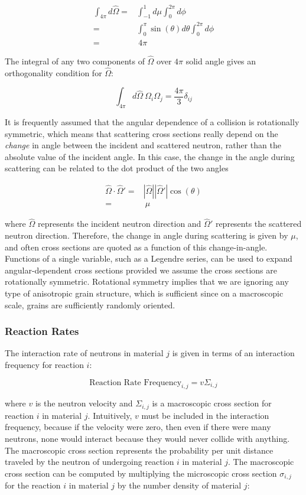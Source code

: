 \documentclass[10pt]{article}
\newcommand{\beq}{\begin{equation}}
\newcommand{\eeq}{\end{equation}}
\newcommand{\beqa}{\begin{equation}\begin{aligned}}
\newcommand{\eeqa}{\end{aligned}\end{equation}}
\newcommand{\hO}{\hat{\Omega}}
\newcommand{\Om}{\Omega}
\begin{document}
\begin{flushleft}
\beqa
\label{eq:4PiOmegaIntegral}
\int_{4\pi}^{ } d\hO   = &\int_{-1}^{1} d\mu \int_{0}^{2\pi} d\phi \\
=& \int_{0}^{\pi} \sin{(\theta)}d\theta \int_{0}^{2\pi} d\phi \\
= &\ 4\pi
\eeqa

The integral of any two components of \(\hO\) over \(4\pi\) solid angle gives an orthogonality condition for \(\hO\):

\beq
\label{eq:4PiOmegaOmega}
\int_{4\pi}^{ } d\hO\ \Om_i\Om_j = \frac{4\pi}{3}\delta_{ij}
\eeq

It is frequently assumed that the angular dependence of a collision is rotationally symmetric, which means that scattering cross sections really depend on the \textit{change} in angle between the incident and scattered neutron, rather than the absolute value of the incident angle. In this case, the change in the angle during scattering can be related to the dot product of the two angles

\beqa
\label{eq:OmegaDotOmega}
\hO  \cdot\hO  ' =& |\hO  ||\hO  '| \cos{(\theta)} \\
=&\ \mu
\eeqa

where \(\hO\) represents the incident neutron direction and \(\hO'\) represents the scattered neutron direction. Therefore, the change in angle during scattering is given by \(\mu\), and often cross sections are quoted as a function of this change-in-angle. Functions of a single variable, such as a Legendre series, can be used to expand angular-dependent cross sections provided we assume the cross sections are rotationally symmetric. Rotational symmetry implies that we are ignoring any type of anisotropic grain structure, which is sufficient since on a macroscopic scale, grains are sufficiently randomly oriented. 

\subsubsection{Reaction Rates}

The interaction rate of neutrons in material \(j\) is given in terms of an interaction frequency for reaction \(i\):

\begin{equation}
\label{eq:ReactionFrequency}
\textrm{Reaction Rate Frequency}_{i, j} = v\Sigma_{i, j}
\end{equation}

where \(v\) is the neutron velocity and \(\Sigma_{i, j}\) is a macroscopic cross section for reaction \(i\) in material \(j\). Intuitively, \(v\) must be included in the interaction frequency, because if the velocity were zero, then even if there were many neutrons, none would interact because they would never collide with anything. The macroscopic cross section represents the probability per unit distance traveled by the neutron of undergoing reaction \(i\) in material \(j\). The macroscopic cross section can be computed by multiplying the microscopic cross section \(\sigma_{i,j}\) for the reaction \(i\) in material \(j\) by the number density of material \(j\):


\end{flushleft}
\end{document}
